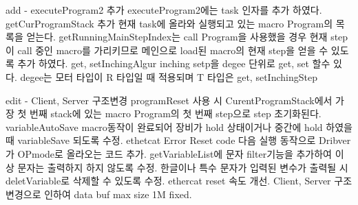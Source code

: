 \begin{DoxyVerb}    add  - executeProgram2 추가 executeProgram2에는 task 인자를 추가 하였다.
           getCurProgramStack 추가 현재 task에 올라와 실행되고 있는 macro Program의 목록을 얻는다.
           getRunningMainStepIndex는 call Program을 사용했을 경우 현재 step이 call 중인 macro를 가리키므로
           메인으로 load된 macro의 현재 step을 얻을 수 있도록 추가 하였다.
           get, setInchingAlgur inching setp을 degee 단위로 get, set 할수 있다. degee는 모터 타입이 R 타입일 때 적용되며 T 타입은
           get, setInchingStep

    edit - Client, Server 구조변경
           programReset 사용 시 CurentProgramStack에서 가장 첫 번째 stack에 있는 macro Program의 첫 번째 step으로 step 초기화된다.
           variableAutoSave macro동작이 완료되어 장비가 hold 상태이거나 중간에 hold 하였을 때 variableSave 되도록 수정.
           ethetcat Error Reset code 다음 실행 동작으로 Dribver가 OPmode로 올라오는 코드 추가.
           getVariableList에 문자 filter기능을 추가하여 이상 문자는 출력하지 하지 않도록 수정.
           한글이나 특수 문자가 입력된 변수가 출력될 시 deletVariable로 삭제할 수 있도록 수정.
           ethercat reset 속도 개선.
           Client, Server 구조변경으로 인하여 data buf max size 1M fixed.\end{DoxyVerb}
 